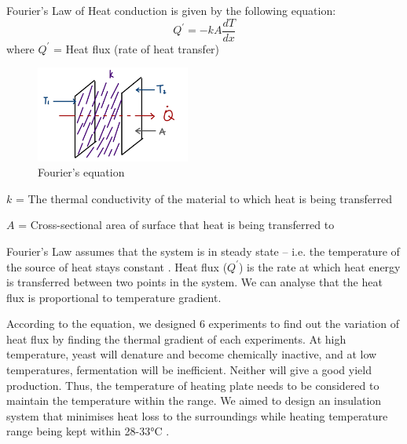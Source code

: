 Fourier’s Law of Heat conduction is given by the following equation:
\begin{equation}\label{eq:HeatFlux}
    Q^{'} = -kA\frac{dT}{dx}
\end{equation}
where
$Q^{'}$ = Heat flux (rate of heat transfer)

\begin{figure}[h!]
    \begin{center}
        \includegraphics[width=0.45\textwidth]{Fourier.png}
    \end{center}
    \caption{Fourier's equation}
\end{figure}

$k$ = The thermal conductivity of the material to which heat is being transferred 

$A$ = Cross-sectional area of surface that heat is being transferred to

Fourier’s Law assumes that the system is in steady state -- i.e. the temperature of the source of heat stays constant \cite{DaianJeanFrancois2014}. Heat flux ($Q^{'}$) is the rate at which heat energy is transferred between two points in the system. We can analyse that the heat flux is proportional to temperature gradient.

According to the equation, we designed 6 experiments to find out the variation of heat flux by finding the thermal gradient of each experiments. At high temperature, yeast will denature and become chemically inactive, and at low temperatures, fermentation will be inefficient. Neither will give a good yield production. Thus, the temperature of heating plate needs to be considered to maintain the temperature within the range. We aimed to design an insulation system that minimises heat loss to the surroundings while heating temperature range being kept within 28-33\si{\celsius} \cite{LIU20191}.  